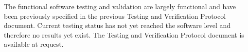 \documentclass{article}
\begin{document}
The functional software testing and validation are largely functional
and have been previously specified in the previous Testing and
Verification Protocol document. Current testing status has not yet
reached the software level and therefore no results yet exist. The
Testing and Verification Protocol document is available at request.
\newpage




\newpage
{}


\end{document}
